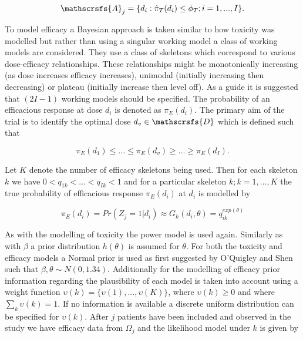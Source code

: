 \begin{equation}
\mathscrsfs{A}_j = \{d_i : \hat{\pi}_T(d_i)  \leq \phi_T ; i = 1,...,I \}.
\end{equation} 

To model efficacy a Bayesian approach is taken similar to how toxicity was modelled but rather than using a singular working model a class of working models are considered. They use a class of skeletons which correspond to various dose-efficacy relationships. These relationships might be monotonically increasing (as dose increases efficacy increases), unimodal (initially increasing then decreasing) or plateau (initially increase then level off). As a guide it is suggested that $(2I-1)$ working models should be specified. The probability of an efficacious response at dose $d_i$ is denoted as $\pi_E(d_i)$. The primary aim of the trial is to identify the optimal dose $d_v \in \mathscrsfs{D}$ which is defined such  that 

\begin{equation}
\pi_E(d_1) \leq ... \leq \pi_E(d_v) \geq ... \geq \pi_E(d_I). 
\end{equation}

Let $K$ denote the number of efficacy skeletons being used. Then for each skeleton $k$ we have $0 < q_{1k} < ... <q_{Ik} <1$ and for a particular skeleton $k; k = 1,...,K$ the true probability of efficacious response $\pi_E(d_i)$ at $d_i$ is modelled by 

\begin{equation}
\pi_E(d_i) = Pr(Z_j = 1|d_i) \approx G_k(d_i,\theta) = q_{ik} ^{exp(\theta)}
\end{equation}

As with the modelling of toxicity the power model is used again. Similarly as with $\beta$ a prior distribution $h(\theta)$ is assumed for $\theta$. For both the toxicity and efficacy models a Normal prior is used as first suggested by O'Quigley and Shen \cite{oquigleyContinualReassessmentMethod1996} such that $\beta, \theta \sim N(0,1.34)$. Additionally for the modelling of efficacy prior information regarding the plausibility of each model is taken into account using a weight function $\upsilon(k) = \{\upsilon(1), ..., \upsilon(K)\}$, where $\upsilon(k) \geq 0$ and where $\sum_k \upsilon(k) = 1$. If no information is available a discrete uniform distribution can be specified for $\upsilon(k)$. After $j$ patients have been included and observed in the study we have efficacy data from $\Omega_j$ and the likelihood model under $k$ is given by 

